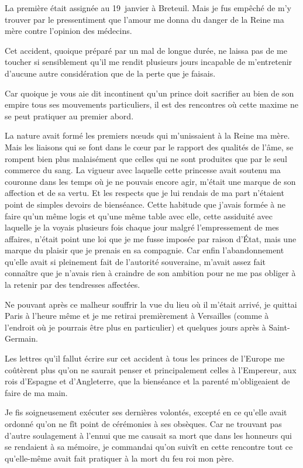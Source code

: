 \documentclass[french,twoside]{book} %
\begin{document}
La première était assignée au 19 janvier à Breteuil. Mais je fus empêché de m’y trouver par le pressentiment que l’amour me donna du danger de la Reine ma mère contre l’opinion des médecins.\par
Cet accident, quoique préparé par un mal de longue durée, ne laissa pas de me toucher si sensiblement qu’il me rendit plusieurs jours incapable de m’entretenir d’aucune autre considération que de la perte que je faisais.\par
Car quoique je vous aie dit incontinent qu’un prince doit sacrifier au bien de son empire tous ses mouvements particuliers, il est des rencontres où cette maxime ne se peut pratiquer au premier abord.\par
La nature avait formé les premiers nœuds qui m’unissaient à la Reine ma mère. Mais les liaisons qui se font dans le cœur par le rapport des qualités de l’âme, se rompent bien plus malaisément que celles qui ne sont produites que par le seul commerce du sang. La vigueur avec laquelle cette princesse avait soutenu ma couronne dans les temps où je ne pouvais encore agir, m’était une marque de son affection et de sa vertu. Et les respects que je lui rendais de ma part n’étaient point de simples devoirs de bienséance. Cette habitude que j’avais formée à ne faire qu’un même logis et qu’une même table avec elle, cette assiduité avec laquelle je la voyais plusieurs fois chaque jour malgré l’empressement de mes affaires, n’était point une loi que je me fusse imposée par raison d’État, mais une marque du plaisir que je prenais en sa compagnie. Car enfin l’abandonnement qu’elle avait si pleinement fait de l’autorité souveraine, m’avait assez fait connaître que je n’avais rien à craindre de son ambition pour ne me pas obliger à la retenir par des tendresses affectées.\par
Ne pouvant après ce malheur souffrir la vue du lieu où il m’était arrivé, je quittai Paris à l’heure même et je me retirai premièrement à Versailles (comme à l’endroit où je pourrais être plus en particulier) et quelques jours après à Saint-Germain.\par
Les lettres qu’il fallut écrire sur cet accident à tous les princes de l’Europe me coûtèrent plus qu’on ne saurait penser et principalement celles à l’Empereur, aux rois d’Espagne et d’Angleterre, que la bienséance et la parenté m’obligeaient de faire de ma main.\par
Je fis soigneusement exécuter ses dernières volontés, excepté en ce qu’elle avait ordonné qu’on ne fît point de cérémonies à ses obsèques. Car ne trouvant pas d’autre soulagement à l’ennui que me causait sa mort que dans les honneurs qui se rendaient à sa mémoire, je commandai qu’on suivît en cette rencontre tout ce qu’elle-même avait fait pratiquer à la mort du feu roi mon père.\par
\end{document}
